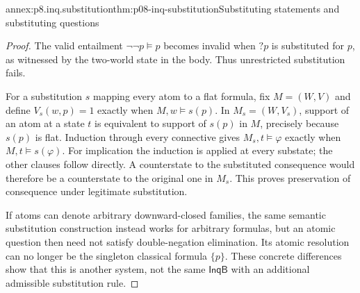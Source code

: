 \begin{annexitem}{annex:p8.inq.substitution}{thm:p08-inq-substitution}{Substituting statements and substituting questions}
\begin{proof}
The valid entailment \(\neg\neg p\models p\) becomes invalid when
\(?p\) is substituted for \(p\), as witnessed by the two-world state
in the body. Thus unrestricted substitution fails.

For a substitution \(s\) mapping every atom to a flat formula, fix
\(M=(W,V)\) and define \(V_s(w,p)=1\) exactly when
\(M,w\models s(p)\). In \(M_s=(W,V_s)\), support of an atom at a
state \(t\) is equivalent to support of \(s(p)\) in \(M\), precisely
because \(s(p)\) is flat. Induction through every connective gives
\(M_s,t\models\varphi\) exactly when \(M,t\models s(\varphi)\).
For implication the induction is applied at every substate; the other
clauses follow directly. A counterstate to the substituted consequence
would therefore be a counterstate to the original one in \(M_s\).
This proves preservation of consequence under legitimate substitution.

If atoms can denote arbitrary downward-closed families, the same semantic
substitution construction instead works for arbitrary formulas, but an
atomic question then need not satisfy double-negation elimination. Its
atomic resolution can no longer be the singleton classical formula
\(\{p\}\). These concrete differences show that this is another system,
not the same \(\mathsf{InqB}\) with an additional admissible substitution rule.
\end{proof}
\end{annexitem}

